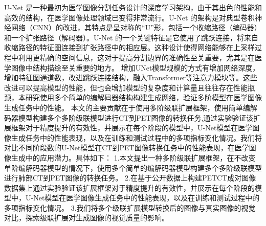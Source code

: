\documentclass[twocolumn]{article}
\begin{document}
U-Net 是一种最初为医学图像分割任务设计的深度学习架构，由于其出色的性能和高效的结构，在医学图像处理领域已变得非常流行。U-Net 的架构是对典型卷积神经网络（CNN）的改进，其特点是呈对称的“U”形，包括一个收缩路径（编码器）和一个扩张路径（解码器）。U-Net 的一个关键特征是它使用了跳跃连接，将来自收缩路径的特征图连接到扩张路径中的相应层。这种设计使得网络能够在上采样过程中利用更精确的空间信息，这对于提高分割边界的准确性至关重要，尤其是在医学图像中结构描绘至关重要的地方。
增加UNet模型规模的方式有增加网络深度，增加特征图通道数，改进跳跃连接结构，融入Transformer等注意力模块等。这些改进可以提高模型的性能，但也会增加模型的复杂度和计算量且往往存在性能瓶颈，本研究使用多个简单的编解码器结构构建生成网络，验证多阶模型在医学图像生成任务中的性能。
本文的主要贡献在于使用多阶级联扩展框架，使用简单编解码器模型构建多个多阶级联模型进行CT到PET图像的转换任务,通过实验验证该扩展框架对于精度提升的有效性，并展示在每个阶段的模型中，U-Net模型在医学图像生成任务中的性能表现，以及在训练和测试过程中的多项指标变化情况。我们将对比不同阶段数的U-Net模型在CT到PET图像转换任务中的性能表现，在医学图像生成中的应用潜力。具体如下：
1.本文提出一种多阶级联扩展框架，在不改变单阶编解码器模型的情况下，使用多个简单的编解码器模型构建多个多阶级联模型进行肺部CT到PET图像的转换任务。
2.在基于公开数据上构建PETCT成对图像数据集上通过实验验证该扩展框架对于精度提升的有效性，并展示在每个阶段的模型中，U-Net模型在医学图像生成任务中的性能表现，以及在训练和测试过程中的多项指标变化情况。
3.我们将多个级联扩展模型转换后的图像与真实图像的视觉对比，探索级联扩展对生成图像的视觉质量的影响。
\end{document}
